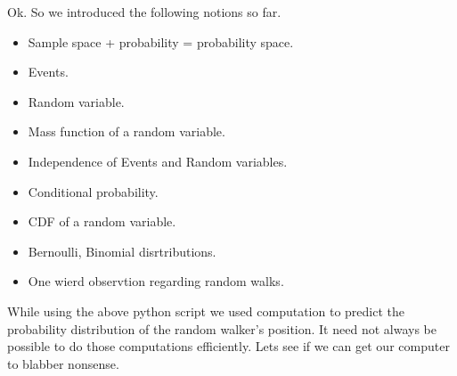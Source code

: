 \documentclass{myclass}
\begin{document}
Ok. So we introduced the following notions so far.
\begin{itemize}
    \item Sample space + probability = probability space.
    \item Events.
    \item Random variable.
    \item Mass function of a random variable.
    \item Independence of Events and Random variables.
    \item Conditional probability.
    \item CDF of a random variable.
    \item Bernoulli, Binomial disrtributions.
    \item One wierd observtion regarding random walks.
\end{itemize}
While using the above python script we used computation to predict the  probability distribution of the 
random walker's position. It need not always be possible to do those computations efficiently. Lets see if we can get our computer to blabber nonsense.
\end{document}
